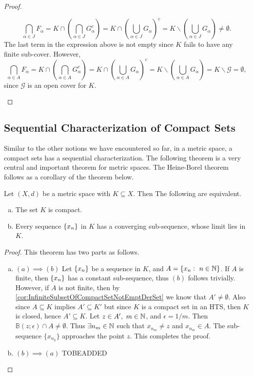 \begin{proof}
\begin{itemize}
\begin{itemize}
			\[ \bigcap_{\alpha \in J} F_\alpha = K \cap (\bigcap_{\alpha\in J} G_\alpha^c) = K \cap (\bigcup_{\alpha\in J} G_\alpha)^c =  K \backslash (\bigcup_{\alpha\in J} G_\alpha) \neq \emptyset.  \]
			The last term in the expression above is not empty since $K$ fails to have any finite sub-cover. However, 
			\[ \bigcap_{\alpha \in A} F_\alpha = K \cap (\bigcap_{\alpha\in A} G_\alpha^c) = K \cap (\bigcup_{\alpha\in A} G_\alpha)^c =  K \backslash (\bigcup_{\alpha\in A} G_\alpha) =  K \backslash \mathcal{G} = \emptyset,  \]
			since $\mathcal{G}$ is an open cover for $K$.
		\end{itemize}
	\end{itemize}
\end{proof}


\subsection{Sequential Characterization of Compact Sets}

Similar to the other notions we have encountered so far, in a metric space, a compact sets has a sequential characterization. The following theorem is a very central and important theorem for metric spaces. The Heine-Borel theorem follows as a corollary of the theorem below.

\begin{theorem}
	\label{thm:SequencialCompactness}
	Let $(X,d)$ be a metric space with $K \subseteq X$. Then The following are equivalent.
	\begin{enumerate}[(a)]
		\item The set $K$ is compact.
		\item Every sequence $\{x_n\}$ in $K$ has a converging sub-sequence, whose limit lies in $K$.
	\end{enumerate}
\end{theorem}
\begin{proof}
	This theorem has two parts as follows.
	\begin{enumerate}[(a)]
		\item $(a) \implies (b)$ Let $\{x_n\}$ be a sequence in $K$, and $A = \{ x_n:\ n\in\mathbb{N} \}$. If $A$ is finite, then $\{x_n\}$ has a constant sub-sequence, thus $(b)$ follows trivially. However, if $A$ is not finite, then by \autoref{cor:InfiniteSubsetOfCompactSetNotEmptDerSet} we know that $A' \neq \emptyset$. Also since $A \subseteq K$ implies $A' \subseteq K'$ but since $K$ is a compact set in an HTS, then $K$ is closed, hence $A' \subseteq K$. Let $z \in A',\ m \in \mathbb{N}$, and $\epsilon=1/m$. Then $\mathbb{B}(z;\epsilon) \cap A \neq \emptyset$. Thus $\exists n_m \in \mathbb{N}$ such that $x_{n_m}\neq z$ and $x_{n_m} \in A$. The sub-sequence $\{x_{n_k}\}$ approaches the point $z$. This completes the proof.
		\item $(b) \implies (a)$ TOBEADDED
	\end{enumerate}
\end{proof}

